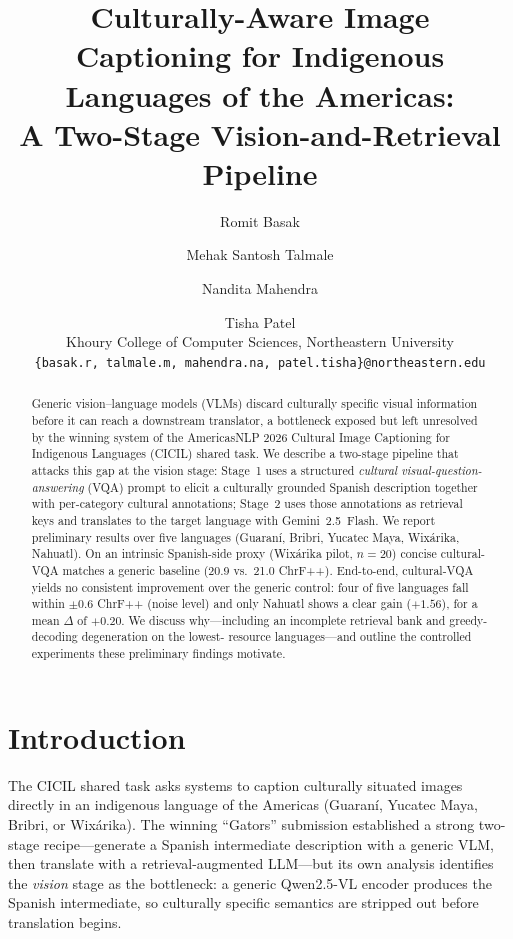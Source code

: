 \documentclass[11pt]{article}
\title{Culturally-Aware Image Captioning for Indigenous Languages of the Americas:\\
A Two-Stage Vision-and-Retrieval Pipeline}
\author{Romit Basak \and Mehak Santosh Talmale \and Nandita Mahendra \and Tisha Patel \\
  Khoury College of Computer Sciences, Northeastern University \\
  \texttt{\{basak.r, talmale.m, mahendra.na, patel.tisha\}@northeastern.edu}}
\begin{document}
\maketitle

\begin{abstract}
Generic vision–language models (VLMs) discard culturally specific visual
information before it can reach a downstream translator, a bottleneck exposed
but left unresolved by the winning system of the AmericasNLP 2026 Cultural
Image Captioning for Indigenous Languages (CICIL) shared task. We describe a
two-stage pipeline that attacks this gap at the vision stage: Stage~1 uses a
structured \emph{cultural visual-question-answering} (VQA) prompt to elicit a
culturally grounded Spanish description together with per-category cultural
annotations; Stage~2 uses those annotations as retrieval keys and translates to
the target language with Gemini~2.5~Flash. We report preliminary results over
five languages (Guaraní, Bribri, Yucatec Maya, Wixárika, Nahuatl). On an
intrinsic Spanish-side proxy (Wixárika pilot, $n{=}20$) concise cultural-VQA
matches a generic baseline (20.9 vs.\ 21.0 ChrF++). End-to-end, cultural-VQA
yields no consistent improvement over the generic control: four of five
languages fall within $\pm 0.6$ ChrF++ (noise level) and only Nahuatl shows a
clear gain ($+1.56$), for a mean $\Delta$ of $+0.20$. We discuss why—including
an incomplete retrieval bank and greedy-decoding degeneration on the lowest-
resource languages—and outline the controlled experiments these preliminary
findings motivate.
\end{abstract}

\section{Introduction}
The CICIL shared task \citep{bui2026cicil} asks systems to caption culturally
situated images directly in an indigenous language of the Americas (Guaraní,
Yucatec Maya, Bribri, or Wixárika). The winning ``Gators'' submission
\citep{dhawan2026gators} established a strong two-stage recipe—generate a
Spanish intermediate description with a generic VLM, then translate with a
retrieval-augmented LLM—but its own analysis identifies the \emph{vision} stage
as the bottleneck: a generic Qwen2.5-VL encoder \citep{qwen2025qwen25vl}
produces the Spanish intermediate, so culturally specific semantics are stripped
out before translation begins.
\end{document}
